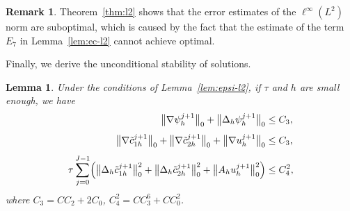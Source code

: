 \documentclass[a4paper,fleqn]{cas-sc}
\numberwithin{equation}{section}
\newtheorem{lemma}[theorem]{Lemma}
\theoremstyle{definition}
\newtheorem{remark}[theorem]{Remark}
\begin{document}
\begin{remark}\label{rem:suboptimal}
Theorem~\ref{thm:l2} shows that the error estimates of the $\ell^{\infty}(L^{2})$ norm are
suboptimal, which is caused by the fact that the estimate of the term $E_{7}$ in
Lemma~\ref{lem:ec-l2} cannot achieve optimal.
\end{remark}

Finally, we derive the unconditional stability of solutions.

\begin{lemma}\label{lem:stability}
Under the conditions of Lemma~\ref{lem:epsi-l2}, if $\tau$ and $h$ are small enough, we have
\begin{align}
  \bigl\|\nabla\psi_{h}^{j+1}\bigr\|_{0}
  + \bigl\|\Delta_{h}\psi_{h}^{j+1}\bigr\|_{0}
  &\leq C_{3},
  \label{eq:4.43}\\[4pt]
  \bigl\|\nabla\tilde{c}_{1h}^{j+1}\bigr\|_{0}
  + \bigl\|\nabla\tilde{c}_{2h}^{j+1}\bigr\|_{0}
  + \bigl\|\nabla u_{h}^{j+1}\bigr\|_{0}
  &\leq C_{3},
  \label{eq:4.44}\\[4pt]
  \tau\sum_{j=0}^{J-1}\Bigl(\bigl\|\Delta_{h}\tilde{c}_{1h}^{j+1}\bigr\|_{0}^{2}
                            + \bigl\|\Delta_{h}\tilde{c}_{2h}^{j+1}\bigr\|_{0}^{2}
                            + \bigl\|A_{h}u_{h}^{j+1}\bigr\|_{0}^{2}\Bigr)
  &\leq C_{4}^{2},
  \label{eq:4.45}
\end{align}
where $C_{3} = CC_{2} + 2C_{0}$, $C_{4}^{2} = CC_{3}^{6} + CC_{0}^{2}$.
\end{lemma}
\end{document}
